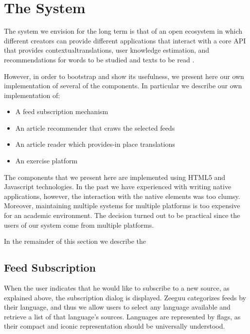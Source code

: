 
\newpage
\section{The System}

The system we envision for the long term is that of an open ecosystem in which different creators can provide different applications that interact with a core API that provides contextualtranslations, user knowledge estimation, and recommendations for words to be studied and texts to be read \cite{Lungu16}.

However, in order to bootstrap and show its usefulness, we present here our own implementation of several of the components. In particular we describe our own implementation of: 

\begin{itemize}
  \item A feed subscription mechanism
  \item An article recommender that craws the selected feeds
  \item An article reader which provides-in place translations
  \item An exercise platform 
\end{itemize}

The components that we present here are implemented using HTML5 and Javascript technologies. In the past we have experienced with writing native applications, however, the interaction with the native elements was too clumsy. Moreover, maintaining multiple systems for multiple platforms is too expensive for an academic environment. The decision turned out to be practical since the users of our system come from multiple platforms.


In the remainder of this section we describe the 


\subsection {Feed Subscription}

When the user indicates that he would like to subscribe to a new source, as explained above, the subscription dialog is displayed. Zeeguu categorizes feeds by their language, and thus we allow users to select any language available and retrieve a list of that language’s sources. Languages are represented by flags, as their compact and iconic representation should be universally understood.

